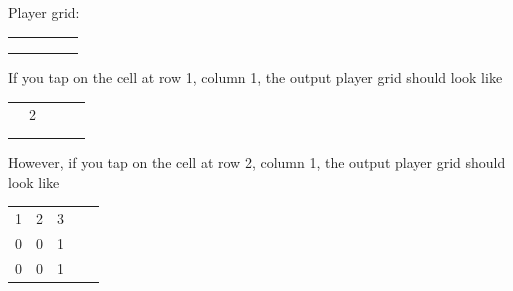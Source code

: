 \documentclass{article}
\begin{document}
\begin{enumerate}[label=(\alph*)]
\begin{itemize}
     \begin{center}
     Player grid: \newline
    \begin{tabular}{ | c | c | c | c | c |}
    \hline
       &  &  &  &  \\
      \hline
       &  &  &  &  \\
      \hline
       &  &  &  &  \\
      \hline
       &  &  &  &  \\
      \hline
    \end{tabular}
    \end{center}

    If you tap on the cell at row 1, column 1, the output player grid should look like 

     \begin{center}
    \begin{tabular}{ | c | c | c | c | c |}
    \hline
       &  &  &  &  \\
      \hline
       & 2 &  &  &  \\
      \hline
       &  & &  &  \\
      \hline
       &  &  & &  \\
      \hline
    \end{tabular}
    \end{center}

    However, if you tap on the cell at row 2, column 1, the output player grid should look like 

     \begin{center}
    \begin{tabular}{ | c | c | c | c | c |}
    \hline
       &  &  &  &  \\
      \hline
       1& 2 & 3 &  &  \\
      \hline
       0 &  0 &  1&  &  \\
      \hline
       0 & 0 &  1&  &  \\
      \hline
    \end{tabular}
    \end{center}


\end{itemize}
\end{enumerate}
\end{document}

